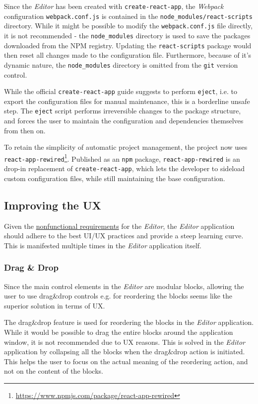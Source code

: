 Since the \textit{Editor} has been created with \texttt{create-react-app}, the \textit{Webpack} configuration \texttt{webpack.conf.js} is contained in the \verb|node_modules/react-scripts| directory.
While it might be possible to modify the \texttt{webpack.conf.js} file directly, it is not recommended - the \verb|node_modules| directory is used to save the packages downloaded from the NPM registry.
Updating the \texttt{react-scripts} package would then reset all changes made to the configuration file.
Furthermore, because of it's dynamic nature, the \verb|node_modules| directory is omitted from the \texttt{git} version control.

While the official \texttt{create-react-app} guide suggests to perform \texttt{eject}, i.e. to export the configuration files for manual maintenance, this is a borderline unsafe step. 
The \texttt{eject} script performs irreversible changes to the package structure, and forces the user to maintain the configuration and dependencies themselves from then on.

To retain the simplicity of automatic project management, the project now uses \texttt{react-app-rewired}\footnote{\url{https://www.npmjs.com/package/react-app-rewired}}.
Published as an \texttt{npm} package, \texttt{react-app-rewired} is an drop-in replacement of \texttt{create-react-app}, which lets the developer to sideload custom configuration files, while still maintaining the base configuration.

\subsection{Improving the \acs{UX}}
Given the \hyperref[requirements]{nonfunctional requirements} for the \textit{Editor}, the \textit{Editor} application should adhere to the best \ac{UI}/\ac{UX} practices and provide a steep learning curve.
This is manifested multiple times in the \textit{Editor} application itself.

\subsubsection{Drag \& Drop}
Since the main control elements in the \textit{Editor} are modular blocks, allowing the user to use drag\&drop controls e.g. for reordering the blocks seems like the superior solution in terms of UX.

The drag\&drop feature is used for reordering the blocks in the \textit{Editor} application.
While it would be possible to drag the entire blocks around the application window, it is not recommended due to UX reasons.
This is solved in the \textit{Editor} application by collapsing all the blocks when the drag\&drop action is initiated.
This helps the user to focus on the actual meaning of the reordering action, and not on the content of the blocks.

